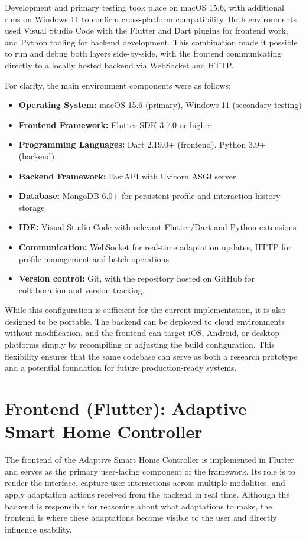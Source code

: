 Development and primary testing took place on macOS 15.6, with additional runs on Windows 11 to confirm cross-platform compatibility. Both environments used Visual Studio Code with the Flutter and Dart plugins for frontend work, and Python tooling for backend development. This combination made it possible to run and debug both layers side-by-side, with the frontend communicating directly to a locally hosted backend via WebSocket and HTTP.

For clarity, the main environment components were as follows:
\begin{itemize}
    \item \textbf{Operating System:} macOS 15.6 (primary), Windows 11 (secondary testing)
    \item \textbf{Frontend Framework:} Flutter SDK 3.7.0 or higher
    \item \textbf{Programming Languages:} Dart 2.19.0+ (frontend), Python 3.9+ (backend)
    \item \textbf{Backend Framework:} FastAPI with Uvicorn ASGI server
    \item \textbf{Database:} MongoDB 6.0+ for persistent profile and interaction history storage
    \item \textbf{IDE:} Visual Studio Code with relevant Flutter/Dart and Python extensions
    \item \textbf{Communication:} WebSocket for real-time adaptation updates, HTTP for profile management and batch operations
    \item \textbf{Version control:} Git, with the repository hosted on GitHub for collaboration and version tracking.
\end{itemize}

While this configuration is sufficient for the current implementation, it is also designed to be portable. The backend can be deployed to cloud environments without modification, and the frontend can target iOS, Android, or desktop platforms simply by recompiling or adjusting the build configuration. This flexibility ensures that the same codebase can serve as both a research prototype and a potential foundation for future production-ready systems.

\section{Frontend (Flutter): Adaptive Smart Home Controller}
The frontend of the Adaptive Smart Home Controller is implemented in Flutter and serves as the primary user-facing component of the framework. Its role is to render the interface, capture user interactions across multiple modalities, and apply adaptation actions received from the backend in real time. Although the backend is responsible for reasoning about what adaptations to make, the frontend is where these adaptations become visible to the user and directly influence usability.

